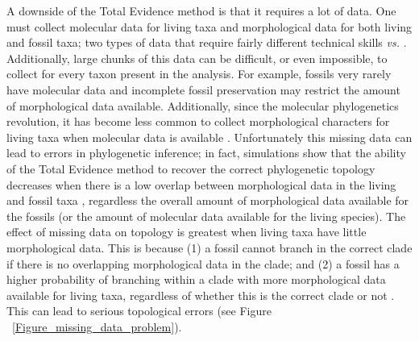 \documentclass[12pt,letterpaper]{article}
\begin{document}
A downside of the Total Evidence method is that it requires a lot of data.
One must collect molecular data for living taxa and morphological data for both living and fossil taxa; two types of data that require fairly different technical skills \citep[e.g.][]{meredithimpacts2011} \textit{vs.} \citep{O'Leary08022013}.
Additionally, large chunks of this data can be difficult, or even impossible, to collect for every taxon present in the analysis.
For example, fossils very rarely have molecular data and incomplete fossil preservation may restrict the amount of morphological data available. %
Additionally, since the molecular phylogenetics revolution, it has become less common to collect morphological characters for living taxa when molecular data is available \citep[e.g.][]{slaterphylogenetic2013,beckancient2014}.
Unfortunately this missing data can lead to errors in phylogenetic inference; in fact, simulations show that the ability of the Total Evidence method to recover the correct phylogenetic topology decreases when there is a low overlap between morphological data in the living and fossil taxa \citep{GuillermeCooper}, regardless the overall amount of morphological data available for the fossils (or the amount of molecular data available for the living species).
The effect of missing data on topology is greatest when living taxa have little morphological data.
This is because (1) a fossil cannot branch in the correct clade if there is no overlapping morphological data in the clade; and (2) a fossil has a higher probability of branching within a clade with more morphological data available for living taxa, regardless of whether this is the correct clade or not \citep{GuillermeCooper}. 
This can lead to serious topological errors (see Figure ~\ref{Figure_missing_data_problem}). 

\end{document}
